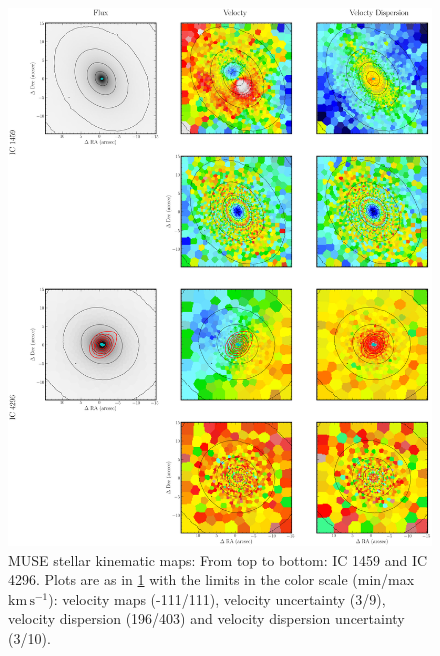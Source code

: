 		\begin{figure}
			\centering
			\includegraphics[height=0.62\textheight]{chapter4/muse/kin1.png}
			\caption[MUSE stellar kinematic maps]{MUSE stellar kinematic maps: From top to bottom: IC 1459 and IC 4296. Plots are as in \ref{fig:MUSE_stellar} with the limits in the color scale (min/max $\mathrm{km \, s^{-1}}$): velocity maps (-111/111), velocity uncertainty (3/9), velocity dispersion (196/403) and velocity dispersion uncertainty (3/10).}
			\label{fig:MUSE_stellar}
		\end{figure}
